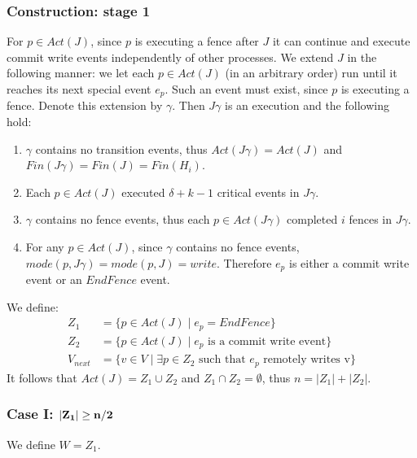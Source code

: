 \subsubsection{Construction: stage 1}
For $p \in Act(J)$, since $p$ is executing a fence after $J$ it can continue and execute commit write events independently of other processes. We extend $J$ in the following manner: we let each $p \in Act(J)$ (in an arbitrary order) run until it reaches its next special event $e_p$. Such an event must exist, since $p$ is executing a fence. Denote this extension by $\gamma$. Then $J \gamma$ is an execution and the following hold:
\begin{enumerate}
	\item $\gamma$ contains no transition events, thus $Act(J \gamma) = Act(J)$ and $Fin(J \gamma) = Fin(J) = Fin(H_i)$.
	\item Each $p \in Act(J)$ executed $\delta+k-1$ critical events in $J \gamma$.
	\item $\gamma$ contains no fence events, thus each $p \in Act(J \gamma)$ completed $i$ fences in $J \gamma$.
	\item For any $p \in Act(J)$, since $\gamma$ contains no fence events, $mode(p,J \gamma) = mode(p,J) = write$. Therefore $e_p$ is either a commit write event or an $EndFence$ event.
	
\end{enumerate}

We define:
\begin{align*}
Z_1 &= \{p \in Act(J) \mid e_p = EndFence\} \\
Z_2 &= \{p \in Act(J) \mid e_p \text{ is a commit write event}\} \\
V_{next} &= \{v \in V \mid \exists p \in Z_2 \text{ such that } e_p \text{ remotely writes v}\}
\end{align*}
It follows that $Act(J) = Z_1 \cup Z_2$ and $Z_1 \cap Z_2 = \emptyset$, thus $n = |Z_1|+|Z_2|$.

\subsubsection*{\hspace{5mm} Case I: $\bf |Z_1| \geq n/2$}
We define $W = Z_1$.

